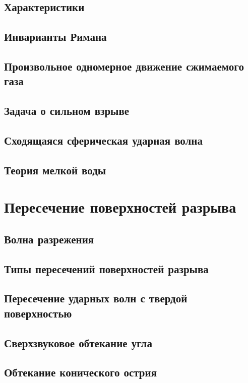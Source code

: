 \documentclass[12pt,a4paper]{book}
\begin{document}
\section{Характеристики}\label{sec:p103}
\section{Инварианты Римана}\label{sec:p104}
\section{Произвольное одномерное движение сжимаемого газа}\label{sec:p105}
\section{Задача о сильном взрыве}\label{sec:p106}
\section{Сходящаяся сферическая ударная волна}\label{sec:p107}
\section{Теория мелкой воды}\label{sec:p108}

\chapter{Пересечение поверхностей разрыва}
\section{Волна разрежения}\label{sec:p109}
\section{Типы пересечений поверхностей разрыва}\label{sec:p110}
\section{Пересечение ударных волн с твердой поверхностью}\label{sec:p111}
\section{Сверхзвуковое обтекание угла}\label{sec:p112}
\section{Обтекание конического острия}\label{sec:p113}
\end{document}
